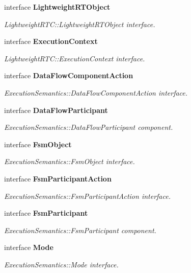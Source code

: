 \begin{CompactItemize}
interface {\bf Lightweight\-RTObject}
\begin{CompactList}\small\item\em Lightweight\-RTC::Lightweight\-RTObject interface. \item\end{CompactList}\item 
interface {\bf Execution\-Context}
\begin{CompactList}\small\item\em Lightweight\-RTC::Execution\-Context interface. \item\end{CompactList}\item 
interface {\bf Data\-Flow\-Component\-Action}
\begin{CompactList}\small\item\em Execution\-Semantics::Data\-Flow\-Component\-Action interface. \item\end{CompactList}\item 
interface {\bf Data\-Flow\-Participant}
\begin{CompactList}\small\item\em Execution\-Semantics::Data\-Flow\-Participant component. \item\end{CompactList}\item 
interface {\bf Fsm\-Object}
\begin{CompactList}\small\item\em Execution\-Semantics::Fsm\-Object interface. \item\end{CompactList}\item 
interface {\bf Fsm\-Participant\-Action}
\begin{CompactList}\small\item\em Execution\-Semantics::Fsm\-Participant\-Action interface. \item\end{CompactList}\item 
interface {\bf Fsm\-Participant}
\begin{CompactList}\small\item\em Execution\-Semantics::Fsm\-Participant component. \item\end{CompactList}\item 
interface {\bf Mode}
\begin{CompactList}\small\item\em Execution\-Semantics::Mode interface. \item\end{CompactList}\item 

\end{CompactItemize}
